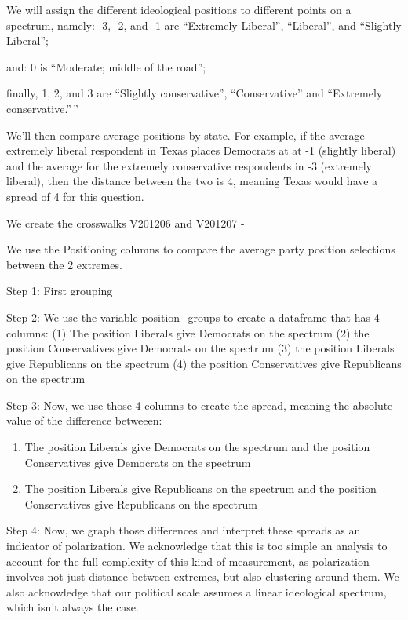 \documentclass[
  letterpaper,
  DIV=11,
  numbers=noendperiod]{scrartcl}
\begin{document}
We will assign the different ideological positions to different points
on a spectrum, namely: -3, -2, and -1 are ``Extremely Liberal'',
``Liberal'', and ``Slightly Liberal'';

and: 0 is ``Moderate; middle of the road'';

finally, 1, 2, and 3 are ``Slightly conservative'', ``Conservative'' and
``Extremely conservative.''\,''

We'll then compare average positions by state. For example, if the
average extremely liberal respondent in Texas places Democrats at at -1
(slightly liberal) and the average for the extremely conservative
respondents in -3 (extremely liberal), then the distance between the two
is 4, meaning Texas would have a spread of 4 for this question.

We create the crosswalks V201206 and V201207 -

We use the Positioning columns to compare the average party position
selections between the 2 extremes.

Step 1: First grouping

Step 2: We use the variable position\_groups to create a dataframe that
has 4 columns: (1) The position Liberals give Democrats on the spectrum
(2) the position Conservatives give Democrats on the spectrum (3) the
position Liberals give Republicans on the spectrum (4) the position
Conservatives give Republicans on the spectrum

Step 3: Now, we use those 4 columns to create the spread, meaning the
absolute value of the difference betweeen:

\begin{enumerate}
\def\labelenumi{(\arabic{enumi})}
\item
  The position Liberals give Democrats on the spectrum and the position
  Conservatives give Democrats on the spectrum
\item
  The position Liberals give Republicans on the spectrum and the
  position Conservatives give Republicans on the spectrum
\end{enumerate}

Step 4: Now, we graph those differences and interpret these spreads as
an indicator of polarization. We acknowledge that this is too simple an
analysis to account for the full complexity of this kind of measurement,
as polarization involves not just distance between extremes, but also
clustering around them. We also acknowledge that our political scale
assumes a linear ideological spectrum, which isn't always the case.
\end{document}
